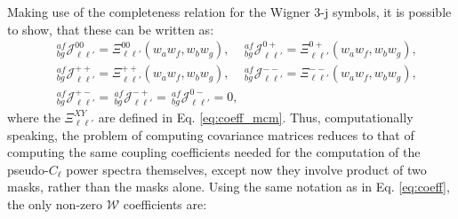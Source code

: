 \documentclass[a4paper,11pt]{article}
\begin{document}
        Making use of the completeness relation for the Wigner 3-j symbols, it is possible to show, that these can be written as:
        \begin{align}
          &\,^{af}_{bg}\mathcal{J}^{00}_{\ell\ell'}=\Xi^{00}_{\ell\ell'}(w_aw_f,w_bw_g),\hspace{12pt}
           \,^{af}_{bg}\mathcal{J}^{0+}_{\ell\ell'}=\Xi^{0+}_{\ell\ell'}(w_aw_f,w_bw_g),\\
          &\,^{af}_{bg}\mathcal{J}^{++}_{\ell\ell'}=\Xi^{++}_{\ell\ell'}(w_aw_f,w_bw_g),\hspace{12pt}
           \,^{af}_{bg}\mathcal{J}^{--}_{\ell\ell'}=\Xi^{--}_{\ell\ell'}(w_aw_f,w_bw_g),\\
          &\,^{af}_{bg}\mathcal{J}^{+-}_{\ell\ell'}=
           \,^{af}_{bg}\mathcal{J}^{-+}_{\ell\ell'}=
           \,^{af}_{bg}\mathcal{J}^{0-}_{\ell\ell'}=0,
        \end{align}
        where the $\Xi^{XY}_{\ell\ell'}$ are defined in Eq. \ref{eq:coeff_mcm}.
        Thus, computationally speaking, the problem of computing covariance matrices reduces to that of computing the same coupling coefficients needed for the computation of the pseudo-$C_\ell$ power spectra themselves, except now they involve product of two masks, rather than the masks alone. Using the same notation as in Eq. \ref{eq:coeff}, the only non-zero $\mathcal{W}$ coefficients are:
\end{document}

